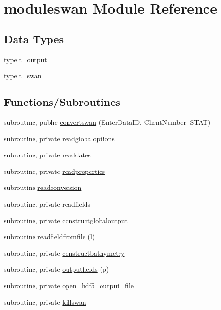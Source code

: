 \hypertarget{namespacemoduleswan}{}\section{moduleswan Module Reference}
\label{namespacemoduleswan}
\subsection*{Data Types}
\begin{DoxyCompactItemize}
\item 
type \mbox{\hyperlink{structmoduleswan_1_1t__output}{t\+\_\+output}}
\item 
type \mbox{\hyperlink{structmoduleswan_1_1t__swan}{t\+\_\+swan}}
\end{DoxyCompactItemize}
\subsection*{Functions/\+Subroutines}
\begin{DoxyCompactItemize}
\item 
subroutine, public \mbox{\hyperlink{namespacemoduleswan_aa4916273cc3ac0c249fd48ef574161b3}{convertswan}} (Enter\+Data\+ID, Client\+Number, S\+T\+AT)
\item 
subroutine, private \mbox{\hyperlink{namespacemoduleswan_a98f6d123b6575342a8d84ba663e5a265}{readglobaloptions}}
\item 
subroutine, private \mbox{\hyperlink{namespacemoduleswan_a21f8abfb6ba4a1cd70fcffe134d3cc55}{readdates}}
\item 
subroutine, private \mbox{\hyperlink{namespacemoduleswan_a15e0f14f5229674aebdd25f0a49a7df2}{readproperties}}
\item 
subroutine \mbox{\hyperlink{namespacemoduleswan_ad7b64582ddb44426de0dd83c9c0b9b42}{readconversion}}
\item 
subroutine, private \mbox{\hyperlink{namespacemoduleswan_a247f3ff2e64affcc137e817aadef34dc}{readfields}}
\item 
subroutine, private \mbox{\hyperlink{namespacemoduleswan_a8d797caa947f1c5d987ee4c2132ce350}{constructglobaloutput}}
\item 
subroutine \mbox{\hyperlink{namespacemoduleswan_a3ba6a86cf192c42aac83c6a40c7addbc}{readfieldfromfile}} (l)
\item 
subroutine, private \mbox{\hyperlink{namespacemoduleswan_ae97863dddc759a89a93ecb9148e2ef90}{constructbathymetry}}
\item 
subroutine, private \mbox{\hyperlink{namespacemoduleswan_a2d1606342b5a9024053f2fceb16ae444}{outputfields}} (p)
\item 
subroutine, private \mbox{\hyperlink{namespacemoduleswan_a857ac03cf8baadbf286cb5fb151b21fc}{open\+\_\+hdf5\+\_\+output\+\_\+file}}
\item 
subroutine, private \mbox{\hyperlink{namespacemoduleswan_a649aac26c71119742c249a918e913f5e}{killswan}}
\end{DoxyCompactItemize}
